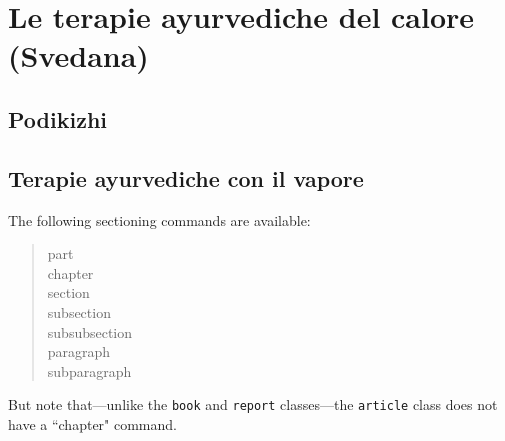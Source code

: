 


\chapter{Le terapie ayurvediche del calore (Svedana)}

\section{Podikizhi}

\section{Terapie ayurvediche con il vapore}

The following sectioning commands are available:
\begin{quote}                           %
 part \\                                %
 chapter \\                             %
 section \\ 
 subsection \\ 
 subsubsection \\ 
 paragraph \\ 
 subparagraph 
\end{quote}                             %
But note that---unlike the \texttt{book} and \texttt{report} classes---the
\texttt{article} class does not have a ``chapter" command.
 
